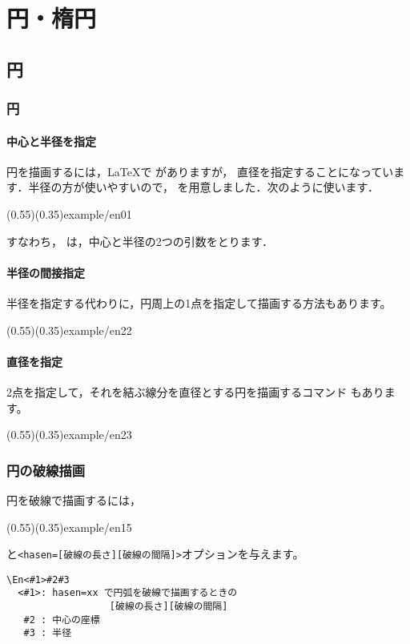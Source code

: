 \section{円・楕円}
\subsection{円}
\subsubsection{円}
\paragraph{中心と半径を指定}
円を描画するには，\LaTeX で  がありますが，
直径を指定することになっています．半径の方が使いやすいので，
 を用意しました．次のように使います．

\showexample[\cmd{En}](0.55)(0.35){example/en01}
\bigskip

すなわち， は，中心と半径の2つの引数をとります．

\paragraph{半径の間接指定}
半径を指定する代わりに，円周上の1点を指定して描画する方法もあります。

(0.55)(0.35){example/en22}
\bigskip

\paragraph{直径を指定}
2点を指定して，それを結ぶ線分を直径とする円を描画するコマンド
もあります。

\showexample[直径を指定](0.55)(0.35){example/en23}
\bigskip

\subsubsection{円の破線描画}
円を破線で描画するには，

\showexample[円周を破線で](0.55)(0.35){example/en15}

と\verb/<hasen=[破線の長さ][破線の間隔]>/オプションを与えます。

\begin{boxnote}
\begin{verbatim}
\En<#1>#2#3
  <#1>: hasen=xx で円弧を破線で描画するときの
                  [破線の長さ][破線の間隔]
   #2 : 中心の座標
   #3 : 半径
\end{verbatim}
\end{boxnote}



